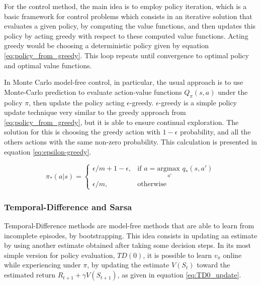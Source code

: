 For the control method, the main idea is to employ policy iteration, which is a basic framework for control problems which consists in an iterative solution that evaluates a given policy, by computing the value functions, and then updates this policy by acting greedy with respect to these computed value functions. Acting greedy would be choosing a deterministic policy given by equation \ref{eq:policy_from_greedy}. This loop repeats until convergence to optimal policy and optimal value functions.

In Monte Carlo model-free control, in particular, the usual approach is to use Monte-Carlo prediction to evaluate action-value functions $Q_{\pi}(s,a)$ under the policy $\pi$, then update the policy acting $\epsilon$-greedy. $\epsilon$-greedy is a simple policy update technique very similar to the greedy approach from \ref{eq:policy_from_greedy}, but it is able to ensure continual exploration. The solution for this is choosing the greedy action with $1-\epsilon$ probability, and all the others actions with the same non-zero probability. This calculation is presented in equation \ref{eq:epsilon-greedy}.

\begin{equation}
 \pi_*(a | s) = 
 \begin{cases}
    \epsilon/m + 1 - \epsilon ,& \text{if } a = \underset{a'}{\textrm{argmax }} q_*(s,a')\\
    \epsilon/m ,& \text{otherwise}
 \end{cases}
 \label{eq:epsilon-greedy}
\end{equation}



\subsubsection{Temporal-Difference and Sarsa}

Temporal-Difference methods are model-free methods that are able to learn from incomplete episodes, by bootstrapping. This idea consists in updating an estimate by using another estimate obtained after taking some decision steps. In its most simple version for policy evaluation, $TD(0)$, it is possible to learn $v_{\pi}$ online while experiencing under $\pi$, by updating the estimate $V(S_t)$ toward the estimated return $R_{t+1} + \gamma V(S_{t+1})$, as given in equation \ref{eq:TD0_update}.

